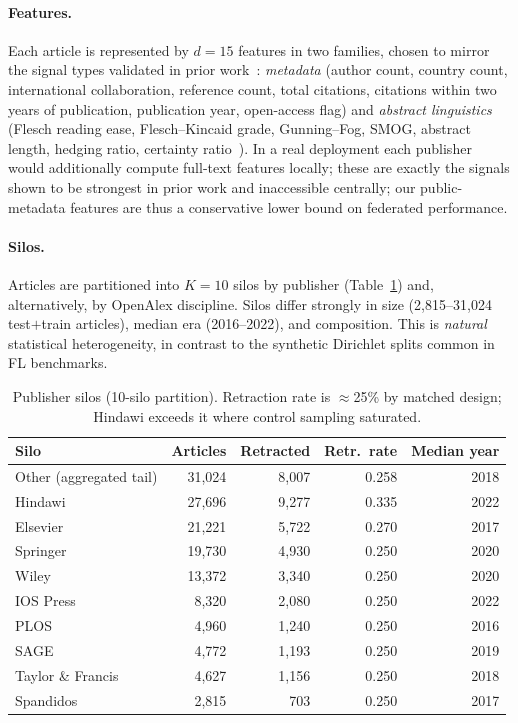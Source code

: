 \documentclass[review,12pt]{elsarticle}
\begin{document}
\paragraph{Features.}
Each article is represented by $d{=}15$ features in two families, chosen to
mirror the signal types validated in prior
work~\cite{ref_usman_websci25,ref_usman_tpdl24}:
\emph{metadata} (author count, country count, international collaboration,
reference count, total citations, citations within two years of publication,
publication year, open-access flag) and \emph{abstract linguistics}
(Flesch reading ease, Flesch--Kincaid grade, Gunning--Fog, SMOG, abstract
length, hedging ratio, certainty ratio~\cite{ref_flesch,ref_kincaid}). In a
real deployment each publisher would additionally compute full-text features
locally; these are exactly the signals shown to be strongest in prior work and
inaccessible centrally; our public-metadata features are thus a conservative
lower bound on federated performance.

\paragraph{Silos.}
Articles are partitioned into $K{=}10$ silos by publisher (Table~\ref{tab:silos})
and, alternatively, by OpenAlex discipline. Silos differ strongly in size
(2{,}815--31{,}024 test$+$train articles), median era (2016--2022), and
composition. This is \emph{natural} statistical heterogeneity, in contrast to the
synthetic Dirichlet splits common in FL benchmarks.

\begin{table}[t]
\centering
\caption{Publisher silos (10-silo partition). Retraction rate is
$\approx$25\% by matched design; Hindawi exceeds it where control
sampling saturated.}
\label{tab:silos}
\small
\begin{tabular}{@{}lrrrr@{}}
\toprule
Silo & Articles & Retracted & Retr.\ rate & Median year \\
\midrule
Other (aggregated tail) & 31{,}024 & 8{,}007 & 0.258 & 2018 \\
Hindawi & 27{,}696 & 9{,}277 & 0.335 & 2022 \\
Elsevier & 21{,}221 & 5{,}722 & 0.270 & 2017 \\
Springer & 19{,}730 & 4{,}930 & 0.250 & 2020 \\
Wiley & 13{,}372 & 3{,}340 & 0.250 & 2020 \\
IOS Press & 8{,}320 & 2{,}080 & 0.250 & 2022 \\
PLOS & 4{,}960 & 1{,}240 & 0.250 & 2016 \\
SAGE & 4{,}772 & 1{,}193 & 0.250 & 2019 \\
Taylor \& Francis & 4{,}627 & 1{,}156 & 0.250 & 2018 \\
Spandidos & 2{,}815 & 703 & 0.250 & 2017 \\
\bottomrule
\end{tabular}
\end{table}
\end{document}

